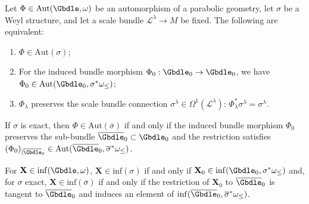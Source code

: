 \begin{Lemma} \label{inessential automorphisms TFAE} Let $\Phi \in \mathrm{Aut}(\Gbdle,\omega)$ be an automorphism of a parabolic geometry, let $\sigma$ be a Weyl structure, and let a scale bundle $\mathcal{L}^{\lambda} \rightarrow M$ be fixed. The following are equivalent:
\begin{enumerate}\itemsep=0pt
\item[$(i)$] $\Phi \in \mathrm{Aut}(\sigma)$;
\item[$(ii)$] For the induced bundle morphism $\Phi_0: \Gbdle_0 \rightarrow \Gbdle_0$, we have $\Phi_0 \in \mathrm{Aut}(\Gbdle_0,\sigma^*\omega_{\leq})$;
\item[$(iii)$] $\Phi_{\lambda}$ preserves the scale bundle connection $\sigma^{\lambda} \in \Omega^1(\mathcal{L}^{\lambda})$: $\Phi_{\lambda}^*\sigma^{\lambda} = \sigma^{\lambda}$.
\end{enumerate}

 If $\sigma$ is exact, then $\Phi \in \mathrm{Aut}(\overline{\sigma})$ if and only if the induced bundle morphism $\Phi_0$ preserves the sub-bundle $\overline{\Gbdle}_0 \subset \Gbdle_0$ and the restriction satisfies $(\Phi_0)_{\vert \overline{\Gbdle}_0} \in \mathrm{Aut}(\overline{\Gbdle}_0,\overline{\sigma}^*\omega_{\leq})$.

For $\mathbf{X} \in \mathrm{inf}(\Gbdle,\omega)$, $\mathbf{X} \in \mathrm{inf}(\sigma)$ if and only if $\mathbf{X}_0 \in \mathrm{inf}(\Gbdle_0,\sigma^*\omega_{\leq})$ and, for $\sigma$ exact, $\mathbf{X} \in \mathrm{inf}(\overline{\sigma})$ if and only if the restriction of $\mathbf{X}_0$ to $\overline{\Gbdle}_0$ is tangent to $\overline{\Gbdle}_0$ and induces an element of $\mathrm{inf}(\overline{\Gbdle}_0,\overline{\sigma}^*\omega_{\leq})$.
\end{Lemma}

